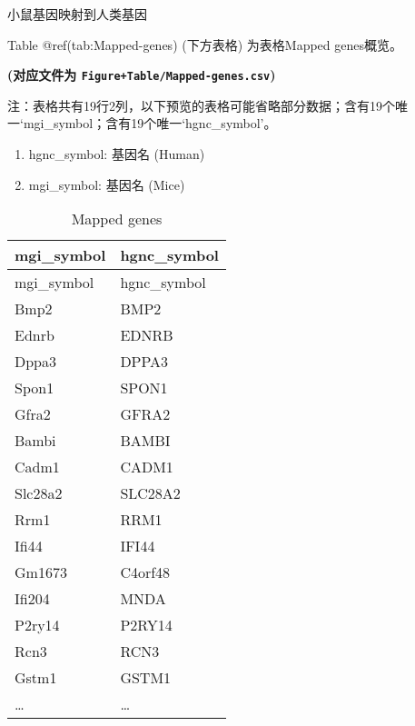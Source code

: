 \documentclass[
  ignorenonframetext,
]{beamer}
\providecommand{\tightlist}{%
  \setlength{\itemsep}{0pt}\setlength{\parskip}{0pt}}
\begin{document}
\begin{frame}[fragile]{小鼠基因映射到人类基因}
\protect\hypertarget{ux5c0fux9f20ux57faux56e0ux6620ux5c04ux5230ux4ebaux7c7bux57faux56e0}{}
\begin{center}\vspace{1.5cm}\end{center}

Table @ref(tab:Mapped-genes) (下方表格) 为表格Mapped genes概览。

\textbf{(对应文件为 \texttt{Figure+Table/Mapped-genes.csv})}

\begin{center}\begin{tcolorbox}[colback=gray!10, colframe=gray!50, width=0.9\linewidth, arc=1mm, boxrule=0.5pt]注：表格共有19行2列，以下预览的表格可能省略部分数据；含有19个唯一`mgi\_symbol；含有19个唯一`hgnc\_symbol'。
\end{tcolorbox}
\end{center}
\begin{center}\begin{tcolorbox}[colback=gray!10, colframe=gray!50, width=0.9\linewidth, arc=1mm, boxrule=0.5pt]\begin{enumerate}\tightlist
\item hgnc\_symbol:  基因名 (Human)
\item mgi\_symbol:  基因名 (Mice)
\end{enumerate}\end{tcolorbox}
\end{center}

\begin{longtable}[]{@{}ll@{}}
\caption{Mapped genes}\tabularnewline
\toprule
mgi\_symbol & hgnc\_symbol\tabularnewline
\midrule
\endfirsthead
\toprule
mgi\_symbol & hgnc\_symbol\tabularnewline
\midrule
\endhead
Bmp2 & BMP2\tabularnewline
Ednrb & EDNRB\tabularnewline
Dppa3 & DPPA3\tabularnewline
Spon1 & SPON1\tabularnewline
Gfra2 & GFRA2\tabularnewline
Bambi & BAMBI\tabularnewline
Cadm1 & CADM1\tabularnewline
Slc28a2 & SLC28A2\tabularnewline
Rrm1 & RRM1\tabularnewline
Ifi44 & IFI44\tabularnewline
Gm1673 & C4orf48\tabularnewline
Ifi204 & MNDA\tabularnewline
P2ry14 & P2RY14\tabularnewline
Rcn3 & RCN3\tabularnewline
Gstm1 & GSTM1\tabularnewline
\ldots{} & \ldots{}\tabularnewline
\bottomrule
\end{longtable}

\begin{center}\vspace{1.5cm}\end{center}
\end{frame}
\end{document}
